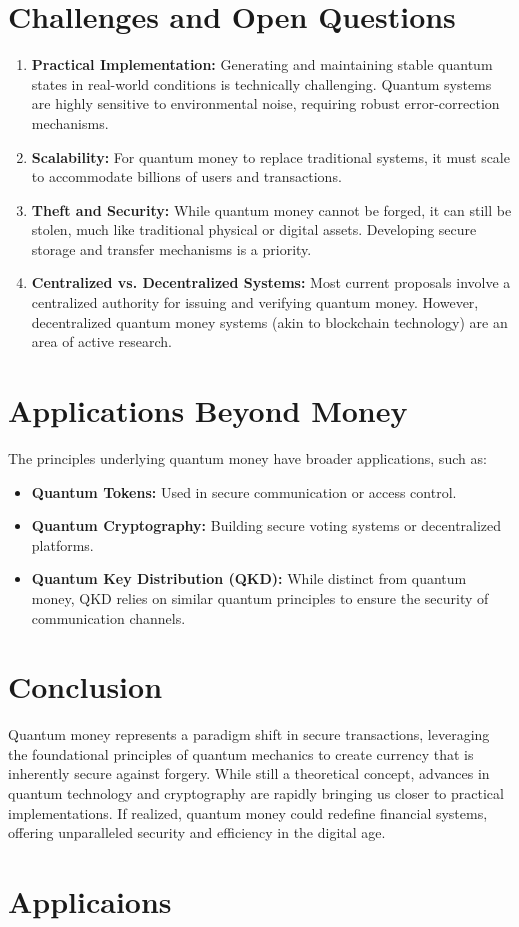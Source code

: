 \documentclass[11pt]{article}
\theoremstyle{definition}
\begin{document}
\section*{Challenges and Open Questions}
\begin{enumerate}
    \item \textbf{Practical Implementation:} Generating and maintaining stable quantum states in real-world conditions is technically challenging. Quantum systems are highly sensitive to environmental noise, requiring robust error-correction mechanisms.
    \item \textbf{Scalability:} For quantum money to replace traditional systems, it must scale to accommodate billions of users and transactions.
    \item \textbf{Theft and Security:} While quantum money cannot be forged, it can still be stolen, much like traditional physical or digital assets. Developing secure storage and transfer mechanisms is a priority.
    \item \textbf{Centralized vs. Decentralized Systems:} Most current proposals involve a centralized authority for issuing and verifying quantum money. However, decentralized quantum money systems (akin to blockchain technology) are an area of active research.
\end{enumerate}

\section*{Applications Beyond Money}
The principles underlying quantum money have broader applications, such as:
\begin{itemize}
    \item \textbf{Quantum Tokens:} Used in secure communication or access control.
    \item \textbf{Quantum Cryptography:} Building secure voting systems or decentralized platforms.
    \item \textbf{Quantum Key Distribution (QKD):} While distinct from quantum money, QKD relies on similar quantum principles to ensure the security of communication channels.
\end{itemize}

\section*{Conclusion}
Quantum money represents a paradigm shift in secure transactions, leveraging the foundational principles of quantum mechanics to create currency that is inherently secure against forgery. While still a theoretical concept, advances in quantum technology and cryptography are rapidly bringing us closer to practical implementations. If realized, quantum money could redefine financial systems, offering unparalleled security and efficiency in the digital age.




\section{Applicaions}



\end{document}
